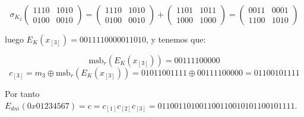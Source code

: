 \documentclass[a4paper]{article}
\begin{document}
$$\sigma_{K_2} \begin{pmatrix} 1110 & 1010 \\ 0100 & 0010 \end{pmatrix} = \begin{pmatrix} 1110 & 1010 \\ 0100 & 0010 \end{pmatrix} + \begin{pmatrix} 1101 & 1011 \\ 1000 & 1000 \end{pmatrix} = \begin{pmatrix} 0011 & 0001 \\ 1100 & 1010 \end{pmatrix}$$


luego $E_K(x_{[3]}) = 0011 1100 0001 1010$, y tenemos que:

$$\text{msb}_r (E_K(x_{[3]})) = 0011 1100 000$$
$$c_{[3]} = m_3 \oplus \text{msb}_r(E_K(x_{[3]})) = 0101 1001 111 \oplus 0011 1100 000 = 0110 0101 111$$

Por tanto $E_{dni} (0x01234567) = c = c_{[1]}c_{[2]}c_{[3]} = 0110 0110 100 1100 1100 101 0110 0101 111$.
\end{document}
